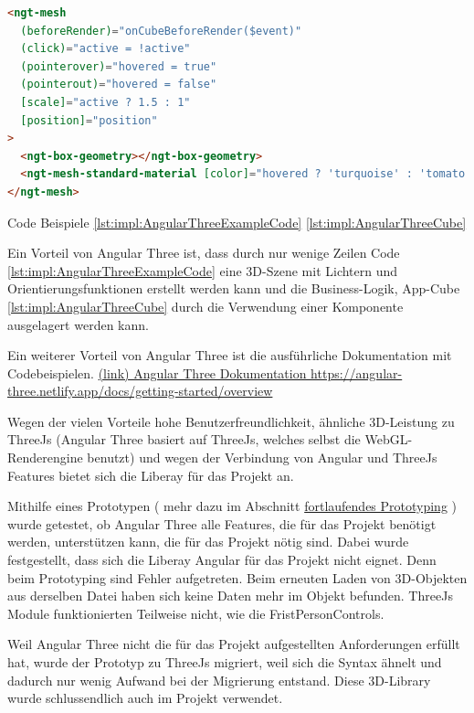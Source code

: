 \begin{lstlisting}[language=html,caption=Angular Three - App Cube,label=lst:impl:AngularThreeCube]
<ngt-mesh
  (beforeRender)="onCubeBeforeRender($event)"
  (click)="active = !active"
  (pointerover)="hovered = true"
  (pointerout)="hovered = false"
  [scale]="active ? 1.5 : 1"
  [position]="position"
>
  <ngt-box-geometry></ngt-box-geometry>
  <ngt-mesh-standard-material [color]="hovered ? 'turquoise' : 'tomato'"></ngt-mesh-standard-material>
</ngt-mesh>
\end{lstlisting}

Code Beispiele \ref{lst:impl:AngularThreeExampleCode} \ref{lst:impl:AngularThreeCube} \cite{AngularThreeDocumentationFirstScene}

Ein Vorteil von Angular Three ist, dass durch nur wenige Zeilen Code \ref{lst:impl:AngularThreeExampleCode} eine 3D-Szene mit Lichtern und Orientierungsfunktionen erstellt werden kann und die Business-Logik, App-Cube \ref{lst:impl:AngularThreeCube} durch die Verwendung einer Komponente ausgelagert werden kann.

Ein weiterer Vorteil von Angular Three ist die ausführliche Dokumentation mit Codebeispielen. \href{https://angular-three.netlify.app/docs/getting-started/overview}{(link) Angular Three Dokumentation https://angular-three.netlify.app/docs/getting-started/overview}

Wegen der vielen Vorteile hohe Benutzerfreundlichkeit, ähnliche 3D-Leistung zu ThreeJs (Angular Three basiert auf ThreeJs, welches selbst die WebGL-Renderengine benutzt) und wegen der Verbindung von Angular und ThreeJs Features bietet sich die Liberay für das Projekt an.

Mithilfe eines Prototypen ( mehr dazu im Abschnitt \hyperref[ch::ongoing-prototyping]{fortlaufendes Prototyping} ) wurde getestet, ob Angular Three alle Features, die für das Projekt benötigt werden, unterstützen kann, die für das Projekt nötig sind. Dabei wurde festgestellt, dass sich die Liberay Angular für das Projekt nicht eignet. Denn beim Prototyping sind Fehler aufgetreten. Beim erneuten Laden von 3D-Objekten aus derselben Datei haben sich keine Daten mehr im Objekt befunden. ThreeJs Module funktionierten Teilweise nicht, wie die FristPersonControls. 

Weil Angular Three nicht die für das Projekt aufgestellten Anforderungen erfüllt hat, wurde der Prototyp zu ThreeJs migriert, weil sich die Syntax ähnelt und dadurch nur wenig Aufwand bei der Migrierung entstand. Diese 3D-Library wurde schlussendlich auch im Projekt verwendet.